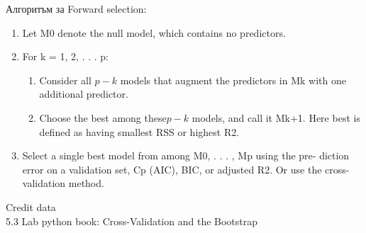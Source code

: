 	Алгоритъм за Forward selection: 
	\begin{enumerate}
				\item Let M0 denote the null model, which contains no predictors.
		\item For k = 1, 2, . . . p: 
		\begin{enumerate}
			\item Consider all $p-k$   models that augment the predictors in Mk
			with one additional predictor.
			\item Choose the best among these$p-k$    models, and call it Mk+1.
			Here best is defined as having smallest RSS or highest R2.
		\end{enumerate}
		\item Select a single best model from among M0, . . . , Mp using the pre-
		diction error on a validation set, Cp (AIC), BIC, or adjusted R2. Or
		use the cross-validation method.
	\end{enumerate}
	
	
	Credit data\\
	
	5.3 Lab python book: Cross-Validation and the Bootstrap \\
	
\newpage
